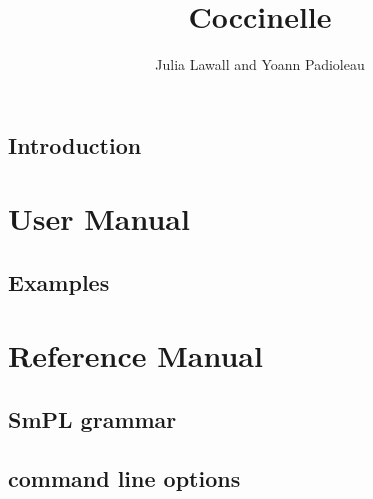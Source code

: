 \documentclass{report}
\begin{document}
\date{}

\title{Coccinelle}

\author{
Julia Lawall and Yoann Padioleau
}  


\maketitle
\tableofcontents


\chapter{Introduction} 





\part{User Manual}

 



\chapter{Examples}
















\part{Reference Manual}

\chapter{SmPL grammar}



\chapter{\spatch command line options}





{\small 


}


\end{document}
